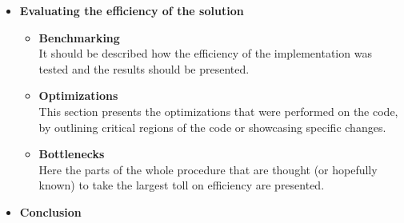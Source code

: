 \begin{itemize}
\begin{itemize}
  \end{itemize}
  \item \textbf{Evaluating the efficiency of the solution}
  \begin{itemize}
    \item \textbf{Benchmarking}\\It should be described how the efficiency of the implementation was tested and the results should be presented.
    \item \textbf{Optimizations}\\This section presents the optimizations that were performed on the code, by outlining critical regions of the code or showcasing specific changes.
    \item \textbf{Bottlenecks}\\Here the parts of the whole procedure that are thought (or hopefully known) to take the largest toll on efficiency are presented.
  \end{itemize}
  \item \textbf{Conclusion}
\end{itemize}
  